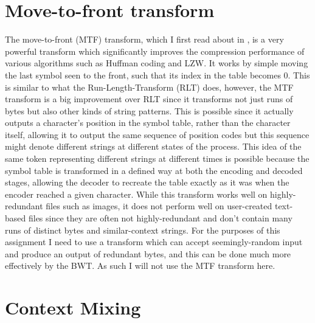 \documentclass[a4paper, 11pt]{article}
\numberwithin{equation}{section}
\theoremstyle{plain}
\theoremstyle{definition}
\begin{document}
\section{Move-to-front transform}
The move-to-front (MTF) transform, which I first read about in \cite{GoogleCompression}, 
is a very powerful transform which significantly improves the compression performance of 
various algorithms such as Huffman coding and LZW. 
It works by simple moving the last symbol seen to the front, such that its index in the table becomes 0. 
This is similar to what the Run-Length-Transform (RLT) does, however, the MTF transform 
is a big improvement over RLT since it transforms not just runs of bytes but also other kinds of 
string patterns. 
This is possible since it actually outputs a character's position in the symbol table, rather than the 
character itself, allowing it to output the same sequence of position codes but this sequence might denote 
different strings at different states of the process. 
This idea of the same token representing different strings at different times is possible because 
the symbol table is transformed in a defined way at both the encoding and decoded stages, allowing 
the decoder to recreate the table exactly as it was when the encoder reached a given character. 
While this transform works well on highly-redundant files such as images, 
it does not perform well on user-created text-based files since they are often not highly-redundant 
and don't contain many runs of distinct bytes and similar-context strings. 
For the purposes of this assignment I need to use a transform which can accept seemingly-random input 
and produce an output of redundant bytes, and this can be done much more effectively by the BWT. 
As such I will not use the MTF transform here.


\section{Context Mixing}
\end{document}
